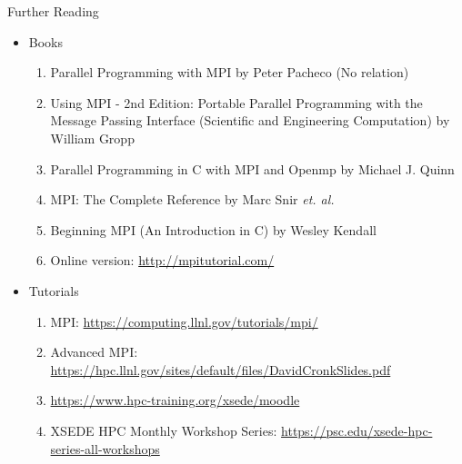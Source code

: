 \documentclass[9pt,c]{beamer}
\begin{document}
\begin{frame}{Further Reading}
  \begin{itemize}
    \item Books
    \begin{enumerate}
      \item Parallel Programming with MPI by Peter Pacheco (No relation)
      \item Using MPI - 2nd Edition: Portable Parallel Programming with the Message Passing Interface (Scientific and Engineering Computation) by William Gropp
      \item Parallel Programming in C with MPI and Openmp by Michael J. Quinn
      \item MPI: The Complete Reference by Marc Snir \textit{et. al.}
      \item Beginning MPI (An Introduction in C) by Wesley Kendall      
      \item[] Online version: \url{http://mpitutorial.com/}
    \end{enumerate}
    \item Tutorials
    \begin{enumerate}
      \item MPI: \url{https://computing.llnl.gov/tutorials/mpi/}
      \item Advanced MPI: \url{https://hpc.llnl.gov/sites/default/files/DavidCronkSlides.pdf}
      \item \url{https://www.hpc-training.org/xsede/moodle}
      \item XSEDE HPC Monthly Workshop Series: \url{https://psc.edu/xsede-hpc-series-all-workshops}
    \end{enumerate}
  \end{itemize}
\end{frame}
\end{document}

